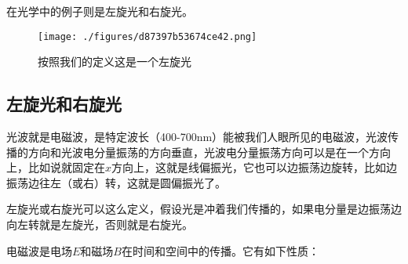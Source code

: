 在光学中的例⼦则是左旋光和右旋光。

\begin{figure}[ht]
\centering
\texttt{[image: ./figures/d87397b53674ce42.png]}
\caption{按照我们的定义这是⼀个左旋光} \label{fig_QMPre6_8}
\end{figure}

\subsection{左旋光和右旋光}

光波就是电磁波，是特定波长（400-700nm）能被我们人眼所见的电磁波，光波传播的方向和光波电分量振荡的方向垂直，光波电分量振荡方向可以是在一个方向上，比如说就固定在$x$方向上，这就是线偏振光，它也可以边振荡边旋转，比如边振荡边往左（或右）转，这就是圆偏振光了。

左旋光或右旋光可以这么定义，假设光是冲着我们传播的，如果电分量是边振荡边向左转就是左旋光，否则就是右旋光。

电磁波是电场$E$和磁场$B$在时间和空间中的传播。它有如下性质：

